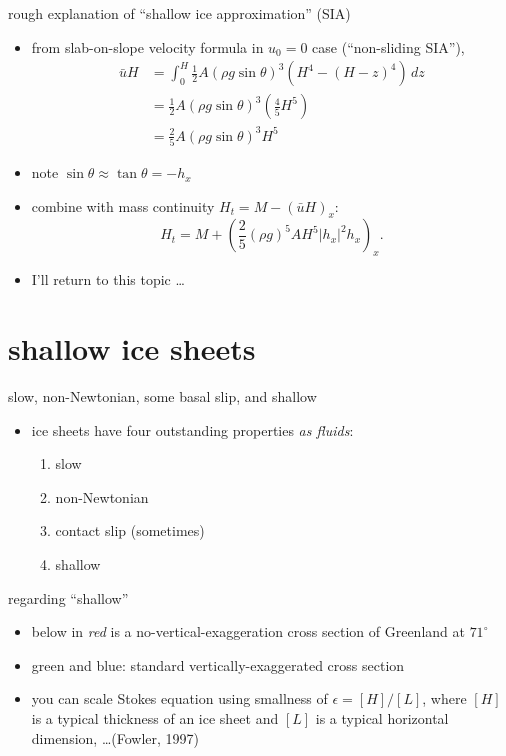 \documentclass[titlepage,letterpaper,final,11pt]{scrartcl}
\newcommand{\eps}{\epsilon}
\newcommand{\alert}[1]{\emph{#1}}
\begin{document}
rough explanation of ``shallow ice approximation'' (SIA)

\begin{itemize}
\item from slab-on-slope velocity formula in $u_0=0$ case (``non-sliding SIA''),
\begin{align*}
\bar u H &= \int_0^H \frac{1}{2} A (\rho g \sin\theta)^3  \left(H^4 - (H-z)^4\right)\,dz \\
	&= \frac{1}{2} A (\rho g \sin\theta)^3  \left(\frac{4}{5} H^5\right) \\
	&= \frac{2}{5} A (\rho g \sin\theta)^3 H^5
\end{align*}
\item note $\sin \theta \approx \tan\theta = - h_x$
\item combine with mass continuity $H_t = M - \left(\bar u H\right)_x$:
  $$H_t = M + \left(\frac{2}{5} (\rho g)^5 A H^5 |h_x|^2 h_x\right)_x.$$
\item I'll return to this topic \dots
\end{itemize}



\section{shallow ice sheets}

slow, non-Newtonian, some basal slip, and shallow

\begin{itemize}
\item ice sheets have four outstanding properties \emph{as fluids}:
  \begin{enumerate}
  \item slow
  \item non-Newtonian
  \item contact slip (sometimes)
  \item shallow
  \end{enumerate}
\end{itemize}

regarding ``shallow''

\begin{itemize}
\item below in \alert{red} is a no-vertical-exaggeration cross section of Greenland at $71^\circ$
\small
\item green and blue: standard vertically-exaggerated cross section
\item you can scale Stokes equation using smallness of $\eps = [H]/[L]$, where $[H]$ is a typical thickness of an ice sheet and $[L]$ is a typical horizontal dimension, \dots (Fowler, 1997)\nocite{Fowler}
\end{itemize}
\end{document}
